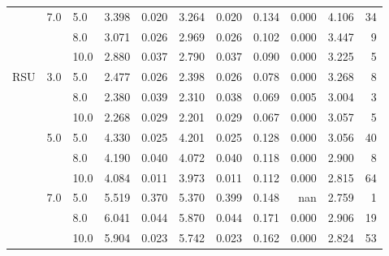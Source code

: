 \begin{tabular}{lllrrrrrrrr}
    & 7.0 & 5.0  & 3.398 &     0.020 &  3.264 &     0.020 &      0.134 &   0.000 &     4.106 &  34 \\
    &     & 8.0  & 3.071 &     0.026 &  2.969 &     0.026 &      0.102 &   0.000 &     3.447 &   9 \\
    &     & 10.0 & 2.880 &     0.037 &  2.790 &     0.037 &      0.090 &   0.000 &     3.225 &   5 \\
RSU & 3.0 & 5.0  & 2.477 &     0.026 &  2.398 &     0.026 &      0.078 &   0.000 &     3.268 &   8 \\
    &     & 8.0  & 2.380 &     0.039 &  2.310 &     0.038 &      0.069 &   0.005 &     3.004 &   3 \\
    &     & 10.0 & 2.268 &     0.029 &  2.201 &     0.029 &      0.067 &   0.000 &     3.057 &   5 \\
    & 5.0 & 5.0  & 4.330 &     0.025 &  4.201 &     0.025 &      0.128 &   0.000 &     3.056 &  40 \\
    &     & 8.0  & 4.190 &     0.040 &  4.072 &     0.040 &      0.118 &   0.000 &     2.900 &   8 \\
    &     & 10.0 & 4.084 &     0.011 &  3.973 &     0.011 &      0.112 &   0.000 &     2.815 &  64 \\
    & 7.0 & 5.0  & 5.519 &     0.370 &  5.370 &     0.399 &      0.148 &     nan &     2.759 &   1 \\
    &     & 8.0  & 6.041 &     0.044 &  5.870 &     0.044 &      0.171 &   0.000 &     2.906 &  19 \\
    &     & 10.0 & 5.904 &     0.023 &  5.742 &     0.023 &      0.162 &   0.000 &     2.824 &  53 \\
\bottomrule
\end{tabular}
